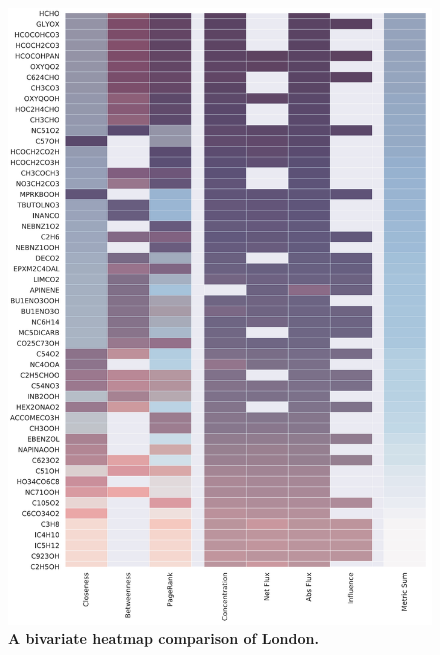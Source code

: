 \begin{figure}[H]
     \centering
         \includegraphics[width=.95\textwidth]{figures_c3/mlpregressor/clfo_London.pdf}
        \caption{ \textbf{A bivariate heatmap comparison of London.} }
        \label{fig:heatl}
\end{figure}

